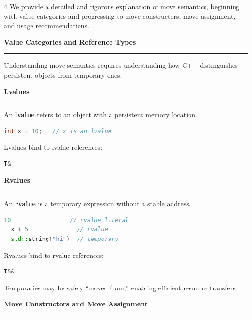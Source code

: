 \documentclass[final]{beamer}
\renewcommand{\section}[1]{%
  \par\vspace{1em}%
  {\noindent\Large\bfseries #1\par}%
  \vspace{0.5em}\hrule\vspace{1em}%
}
\renewcommand{\subsection}[1]{%
  \par\vspace{1em}%
  {\noindent\large\bfseries #1\par}%
  \vspace{0.5em}\hrule\vspace{1em}%

}
\begin{document}
\begin{frame}[t,fragile]
\begin{multicols}{4}
  We provide a detailed and rigorous explanation of move semantics, beginning with value categories and progressing to move constructors, move assignment, and usage recommendations.

  \subsection{Value Categories and Reference Types}

  Understanding move semantics requires understanding how C++ distinguishes persistent objects from temporary ones.

  \subsection{Lvalues}

  An \textbf{lvalue} refers to an object with a persistent memory location.

  \begin{lstlisting}[language=C++]
  int x = 10;   // x is an lvalue
  \end{lstlisting}

  Lvalues bind to lvalue references:

  \begin{lstlisting}[language=C++]
  T&
  \end{lstlisting}

  \subsection{Rvalues}

  An \textbf{rvalue} is a temporary expression without a stable address.

  \begin{lstlisting}[language=C++]
  10                 // rvalue literal
  x + 5              // rvalue
  std::string("hi")  // temporary
  \end{lstlisting}

  Rvalues bind to rvalue references:

  \begin{lstlisting}[language=C++]
  T&&
  \end{lstlisting}
  
  Temporaries may be safely “moved from,” enabling efficient resource transfers.

  \section{Move Constructors and Move Assignment}


\end{multicols}
\end{frame}
\end{document}
